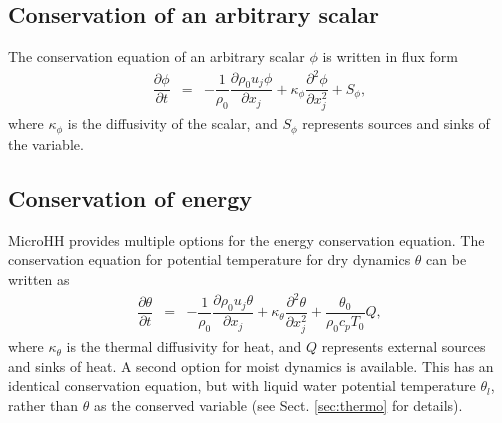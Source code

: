 \documentclass[gmd,manuscript]{copernicus}
\begin{document}
\subsection{Conservation of an arbitrary scalar}
The conservation equation of an arbitrary scalar $\phi$ is written in flux form
\begin{eqnarray}
\dfrac{\partial \phi}{\partial t} & = & - \dfrac{1}{\rho_0} \dfrac{\partial \rho_0 u_j \phi}{\partial x_j} +
\kappa_\phi \dfrac{\partial^2 \phi}{\partial x_j^2} + S_\phi, \label{eq:consscal}
\end{eqnarray}
where $\kappa_\phi$ is the diffusivity of the scalar, and $S_\phi$ represents sources and sinks of the variable.

\subsection{Conservation of energy}\label{sec:dyncore_energy}
\label{sec:conservation_of_energy}
MicroHH provides multiple options for the energy conservation equation. The conservation equation for  potential temperature for dry dynamics $\theta$ can be written as
\begin{eqnarray}
\dfrac{\partial \theta}{\partial t} & = & - \dfrac{1}{\rho_0} \dfrac{\partial \rho_0 u_j \theta}{\partial x_j} + \kappa_\theta \dfrac{\partial^2 \theta}{\partial x_j^2} + \dfrac{\theta_0}{\rho_0 c_p T_0} Q,\label{eq:consthermo}
\end{eqnarray}
where $\kappa_\theta$ is the thermal diffusivity for heat, and $Q$ represents external sources and sinks of heat. A second option for moist dynamics is available. This has an identical conservation equation, but with liquid water potential temperature $\theta_l$, rather than $\theta$ as the conserved variable (see Sect. \ref{sec:thermo} for details). 
\end{document}
